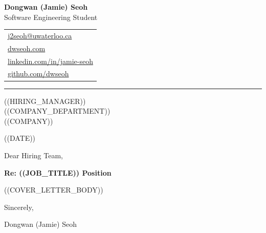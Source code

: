 \documentclass[11pt,a4paper]{article}
\begin{document}
\noindent
\begin{minipage}[t]{0.5\textwidth}
{\color{headerblue}\large\bfseries Dongwan (Jamie) Seoh}\\[2pt]
{\small\color{gray} Software Engineering Student}
\end{minipage}%
\hfill
\begin{minipage}[t]{0.35\textwidth}
\raggedleft
\begin{tabular}[t]{@{}l@{}}
{\small \href{mailto:j2seoh@uwaterloo.ca}{j2seoh@uwaterloo.ca}}\\
{\small \href{https://dwseoh.com}{dwseoh.com}}\\
{\small \href{https://linkedin.com/in/jamie-seoh}{linkedin.com/in/jamie-seoh}}\\
{\small \href{https://github.com/dwseoh}{github.com/dwseoh}}
\end{tabular}
\end{minipage}

\vspace{2pt}
{\color{textgray}\noindent\rule{\textwidth}{0.4pt}}

\vspace{8pt}

\noindent
\begin{minipage}[t]{0.55\textwidth}
((HIRING_MANAGER))\\
((COMPANY_DEPARTMENT))\\
((COMPANY))
\end{minipage}%
\hfill
\begin{minipage}[t]{0.4\textwidth}
\raggedleft
((DATE))
\end{minipage}

\vspace{10pt}

Dear Hiring Team,

\vspace{6pt}

\textbf{Re: ((JOB_TITLE)) Position}

\vspace{8pt}

((COVER_LETTER_BODY))

\vspace{20pt}

Sincerely,

\vspace{0pt}

Dongwan (Jamie) Seoh
\end{document}
